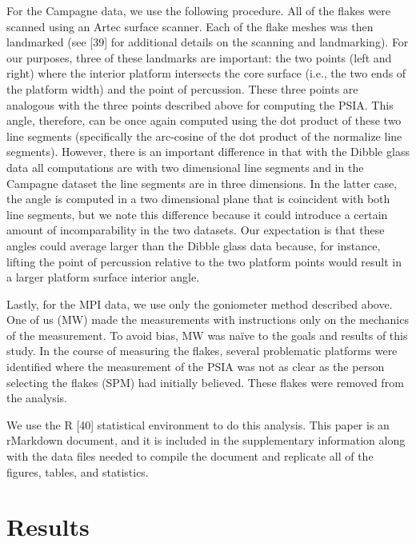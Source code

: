 \documentclass[10pt,letterpaper]{article}
\begin{document}
For the Campagne data, we use the following procedure. All of the flakes
were scanned using an Artec surface scanner. Each of the flake meshes
was then landmarked (see {[}39{]} for additional details on the scanning
and landmarking). For our purposes, three of these landmarks are
important: the two points (left and right) where the interior platform
intersects the core surface (i.e., the two ends of the platform width)
and the point of percussion. These three points are analogous with the
three points described above for computing the PSIA. This angle,
therefore, can be once again computed using the dot product of these two
line segments (specifically the arc-cosine of the dot product of the
normalize line segments). However, there is an important difference in
that with the Dibble glass data all computations are with two
dimensional line segments and in the Campagne dataset the line segments
are in three dimensions. In the latter case, the angle is computed in a
two dimensional plane that is coincident with both line segments, but we
note this difference because it could introduce a certain amount of
incomparability in the two datasets. Our expectation is that these
angles could average larger than the Dibble glass data because, for
instance, lifting the point of percussion relative to the two platform
points would result in a larger platform surface interior angle.

Lastly, for the MPI data, we use only the goniometer method described
above. One of us (MW) made the measurements with instructions only on
the mechanics of the measurement. To avoid bias, MW was naïve to the
goals and results of this study. In the course of measuring the flakes,
several problematic platforms were identified where the measurement of
the PSIA was not as clear as the person selecting the flakes (SPM) had
initially believed. These flakes were removed from the analysis.

We use the R {[}40{]} statistical environment to do this analysis. This
paper is an rMarkdown document, and it is included in the supplementary
information along with the data files needed to compile the document and
replicate all of the figures, tables, and statistics.

\hypertarget{results}{%
\section{Results}\label{results}}
\end{document}
